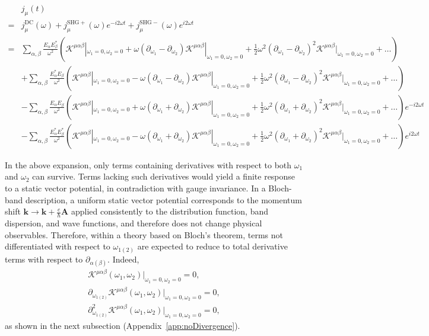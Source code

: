 \documentclass[twocolumn,superscriptaddress]{revtex4-1}
\newcommand{\uprm}[1]{^{\mathrm{#1}}}
\begin{document}
\begin{widetext}
\begin{align}
  &j_\mu(t)\nonumber \\
  =&j_\mu\uprm{DC}(\omega)+j_\mu\uprm{SHG+}(\omega)e^{-i2\omega t}+j_\mu\uprm{SHG-}(\omega)e^{i2\omega t}\nonumber \\
  =&\sum_{\alpha,\beta}\frac{E_\alpha E_\beta^*}{\omega^2}
    (\mathcal{K}^{\mu\alpha\beta}|_{\omega_1=0,\omega_2=0}+\omega(\partial_{\omega_1}-\partial_{\omega_2})\mathcal{K}^{\mu\alpha\beta}|_{\omega_1=0,\omega_2=0}+\frac{1}{2}\omega^2 (\partial_{\omega_1}-\partial_{\omega_2})^2\mathcal{K}^{\mu\alpha\beta}|_{\omega_1=0,\omega_2=0}+\dots) \nonumber \\
  &+\sum_{\alpha,\beta}\frac{E_\alpha^* E_\beta}{\omega^2}(\mathcal{K}^{\mu\alpha\beta}|_{\omega_1=0,\omega_2=0}-\omega(\partial_{\omega_1}-\partial_{\omega_2})\mathcal{K}^{\mu\alpha\beta}|_{\omega_1=0,\omega_2=0}+\frac{1}{2}\omega^2 (\partial_{\omega_1}-\partial_{\omega_2})^2\mathcal{K}^{\mu\alpha\beta}|_{\omega_1=0,\omega_2=0}+\dots)\nonumber \\
  &-\sum_{\alpha,\beta}\frac{E_\alpha E_\beta}{\omega^2}
    (\mathcal{K}^{\mu\alpha\beta}|_{\omega_1=0,\omega_2=0}+\omega(\partial_{\omega_1}+\partial_{\omega_2})\mathcal{K}^{\mu\alpha\beta}|_{\omega_1=0,\omega_2=0}+\frac{1}{2}\omega^2 (\partial_{\omega_1}+\partial_{\omega_2})^2\mathcal{K}^{\mu\alpha\beta}|_{\omega_1=0,\omega_2=0}+\dots) e^{-i2\omega t}\nonumber \\
    & -\sum_{\alpha,\beta}\frac{E_\alpha^* E_\beta^*}{\omega^2} (\mathcal{K}^{\mu\alpha\beta}|_{\omega_1=0,\omega_2=0}-\omega(\partial_{\omega_1}+\partial_{\omega_2})\mathcal{K}^{\mu\alpha\beta}|_{\omega_1=0,\omega_2=0}+\frac{1}{2}\omega^2 (\partial_{\omega_1}+\partial_{\omega_2})^2\mathcal{K}^{\mu\alpha\beta}|_{\omega_1=0,\omega_2=0}+\dots)  e^{i2\omega t} \label{eq:expandK}
\end{align}
\end{widetext}
In the above expansion, only terms containing derivatives with respect to both $\omega_1$ and $\omega_2$ can survive.
Terms lacking such derivatives would yield a finite response to a static vector potential, in contradiction with gauge invariance.
In a Bloch-band description, a uniform static vector potential corresponds to the momentum shift $\bm{k}\to \bm{k}+\frac{e}{\hbar}\bm{A}$ applied consistently to the distribution function, band dispersion, and wave functions, and therefore does not change physical observables.
Therefore, within a theory based on Bloch's theorem, terms not differentiated with respect to $\omega_{1(2)}$ are expected to reduce to total derivative terms with respect to $\partial_{\alpha(\beta)}$.
Indeed, 
\begin{gather}
\mathcal{K}^{\mu\alpha\beta}(\omega_1,\omega_2)|_{\omega_1=0,\omega_2=0}=0,\\ \partial_{\omega_{1(2)}}\mathcal{K}^{\mu\alpha\beta}(\omega_1,\omega_2)|_{\omega_1=0,\omega_2=0}=0,\\ \partial_{\omega_{1(2)}}^2\mathcal{K}^{\mu\alpha\beta}(\omega_1,\omega_2)|_{\omega_1=0,\omega_2=0}=0,     
\end{gather}
as shown in the next subsection (Appendix~\ref{app:noDivergence}).
\end{document}
